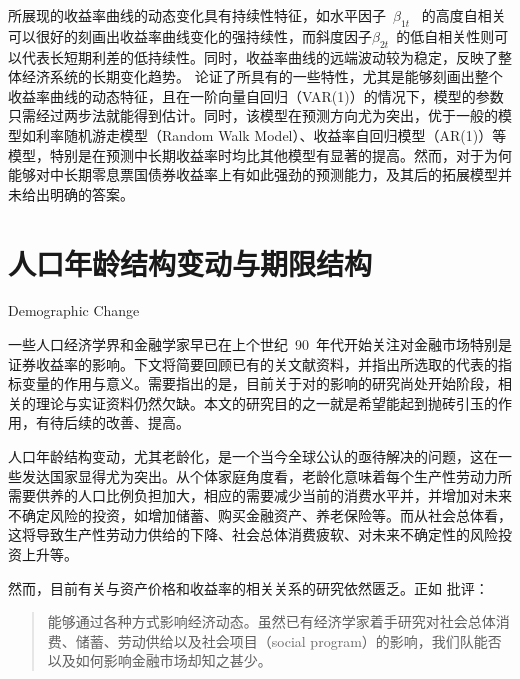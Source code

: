 \dns 所展现的收益率曲线的动态变化具有持续性特征，如水平因子~$\beta_{1t}$~ 的高度自相关可以很好的刻画出收益率曲线变化的强持续性，而斜度因子$\beta_{2t}$~的低自相关性则可以代表长短期利差的低持续性。同时，收益率曲线的远端波动较为稳定，反映了整体经济系统的长期变化趋势。
论证了\dns 所具有的一些特性，尤其是能够刻画出整个收益率曲线的动态特征，且在一阶向量自回归（VAR(1)）的情况下，模型的参数只需经过两步法就能得到估计。同时，该模型在预测方向尤为突出，优于一般的模型如利率随机游走模型（Random Walk Model）、收益率自回归模型（AR(1)）等模型，特别是\dns 在预测中长期收益率时均比其他模型有显著的提高。然而，对于为何\dns 能够对中长期零息票国债券收益率上有如此强劲的预测能力，及其后的拓展模型并未给出明确的答案。



\section{人口年龄结构变动与期限结构}{Demographic Change}

一些人口经济学界和金融学家早已在上个世纪~90~年代开始关注\dsf 对金融市场特别是证券收益率的影响。下文将简要回顾已有的关文献资料，并指出所选取的代表\dsf 的指标变量的作用与意义。需要指出的是，目前关于\dsf 对\ts 的影响的研究尚处开始阶段，相关的理论与实证资料仍然欠缺。本文的研究目的之一就是希望能起到抛砖引玉的作用，有待后续的改善、提高。


人口年龄结构变动，尤其老龄化，是一个当今全球公认的亟待解决的问题，这在一些发达国家显得尤为突出。从个体家庭角度看，老龄化意味着每个生产性劳动力所需要供养的人口比例负担加大，相应的需要减少当前的消费水平并，并增加对未来不确定风险的投资，如增加储蓄、购买金融资产、养老保险等。而从社会总体看，这将导致生产性劳动力供给的下降、社会总体消费疲软、对未来不确定性的风险投资上升等。

然而，目前有关\dsf 与资产价格和收益率的相关关系的研究依然匮乏。正如 批评：
\begin{quotation}
  \dsf 能够通过各种方式影响经济动态。虽然已有经济学家着手研究\dsf 对社会总体消费、储蓄、劳动供给以及社会项目（social program）的影响，我们队\dsf 能否以及如何影响金融市场却知之甚少。
\end{quotation}

